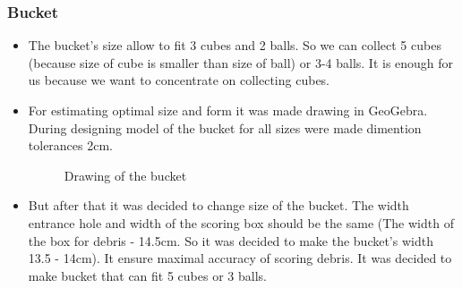 \subsubsection{Bucket} 
\begin{itemize}
\item The bucket's size allow to fit 3 cubes and 2 balls. So we can collect 5 cubes (because size of cube is smaller than size of ball) or 3-4 balls. It is enough for us because we want to concentrate on collecting cubes. 
\item For estimating optimal size and form it was made drawing in GeoGebra. During designing model of the bucket for all sizes were made dimention tolerances 2cm.
\begin{figure}[H]
	\begin{minipage}[h]{\linewidth}
		\caption{Drawing of the bucket}
	\end{minipage}
\end{figure} 
\item But after that it was decided to change size of the bucket. The width entrance hole and width of the scoring box should be the same (The width of the box for debris - 14.5cm. So it was decided to make the bucket's width 13.5 - 14cm). It ensure maximal accuracy of scoring debris. It was decided to make bucket that can fit 5 cubes or 3 balls.
\begin{figure}[H]
	\begin{minipage}[h]{0.55\linewidth}

\end{minipage}
\end{figure}
\end{itemize}
